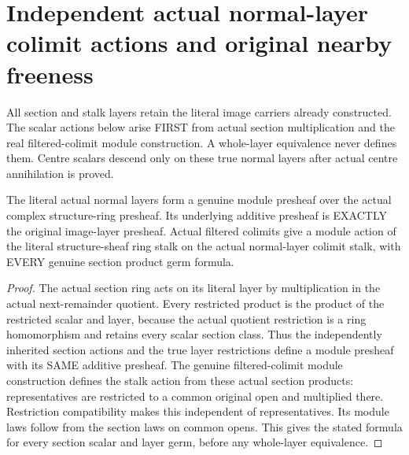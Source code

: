 \section{Independent actual normal-layer colimit actions and original nearby freeness}

All section and stalk layers retain the literal image carriers already
constructed. The scalar actions below arise FIRST from actual section
multiplication and the real filtered-colimit module construction. A
whole-layer equivalence never defines them. Centre scalars descend only
on these true normal layers after actual centre annihilation is proved.

\begin{definition}
\label{hir:real-domain-actual-normal-layer-module-presheaf-stalk-action}
\leanok
The literal actual normal layers form a genuine module presheaf over
the actual complex structure-ring presheaf. Its underlying additive
presheaf is EXACTLY the original image-layer presheaf. Actual filtered
colimits give a module action of the literal structure-sheaf ring stalk
on the actual normal-layer colimit stalk, with EVERY genuine section
product germ formula.
\end{definition}
\begin{proof}
The actual section ring acts on its literal layer by multiplication in
the actual next-remainder quotient. Every restricted product is the
product of the restricted scalar and layer, because the actual quotient
restriction is a ring homomorphism and retains every scalar section class.
Thus the independently inherited section actions and the true layer
restrictions define a module presheaf with its SAME additive presheaf.
The genuine filtered-colimit module construction defines the stalk
action from these actual section products: representatives are restricted
to a common original open and multiplied there. Restriction compatibility
makes this independent of representatives. Its module laws follow from
the section laws on common opens. This gives the stated formula for
every section scalar and layer germ, before any whole-layer equivalence.
\end{proof}

